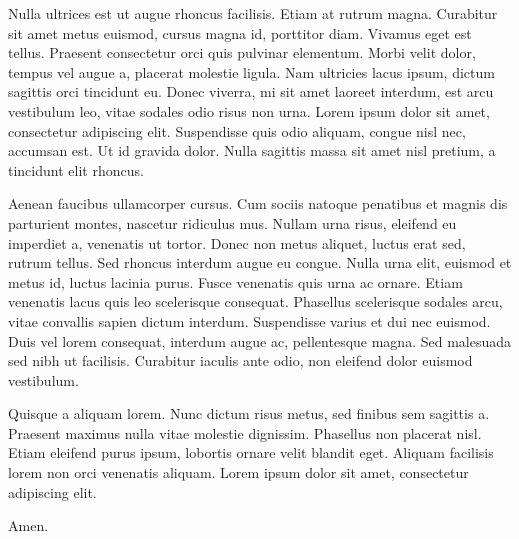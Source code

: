 \documentclass{article}
\begin{document}
Nulla ultrices est ut augue rhoncus facilisis. Etiam at rutrum
magna. Curabitur sit amet metus euismod, cursus magna id, porttitor
diam. Vivamus eget est tellus. Praesent consectetur orci quis pulvinar
elementum. Morbi velit dolor, tempus vel augue a, placerat molestie
ligula. Nam ultricies lacus ipsum, dictum sagittis orci tincidunt
eu. Donec viverra, mi sit amet laoreet interdum, est arcu vestibulum
leo, vitae sodales odio risus non urna. Lorem ipsum dolor sit amet,
consectetur adipiscing elit. Suspendisse quis odio aliquam, congue
nisl nec, accumsan est. Ut id gravida dolor. Nulla sagittis massa sit
amet nisl pretium, a tincidunt elit rhoncus.

Aenean faucibus ullamcorper cursus. Cum sociis natoque penatibus et
magnis dis parturient montes, nascetur ridiculus mus. Nullam urna
risus, eleifend eu imperdiet a, venenatis ut tortor. Donec non metus
aliquet, luctus erat sed, rutrum tellus. Sed rhoncus interdum augue eu
congue. Nulla urna elit, euismod et metus id, luctus lacinia
purus. Fusce venenatis quis urna ac ornare. Etiam venenatis lacus quis
leo scelerisque consequat. Phasellus scelerisque sodales arcu, vitae
convallis sapien dictum interdum. Suspendisse varius et dui nec
euismod. Duis vel lorem consequat, interdum augue ac, pellentesque
magna. Sed malesuada sed nibh ut facilisis. Curabitur iaculis ante
odio, non eleifend dolor euismod vestibulum.

Quisque a aliquam lorem. Nunc dictum risus metus, sed finibus sem
sagittis a. Praesent maximus nulla vitae molestie dignissim. Phasellus
non placerat nisl. Etiam eleifend purus ipsum, lobortis ornare velit
blandit eget. Aliquam facilisis lorem non orci venenatis
aliquam. Lorem ipsum dolor sit amet, consectetur adipiscing elit.

Amen.
\end{document}
